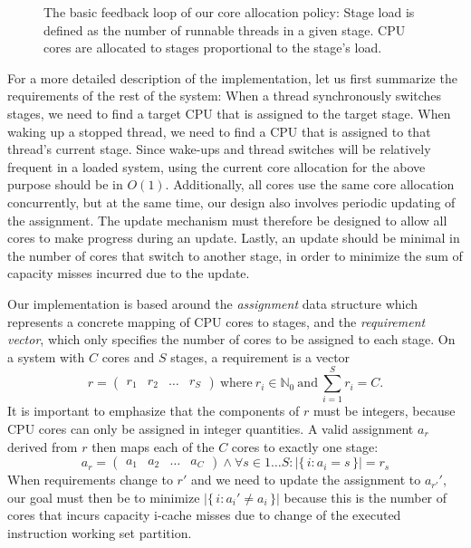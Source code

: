 \documentclass[12pt,a4paper]{book}
\begin{document}
\begin{figure}
    \caption{The basic feedback loop of our core allocation policy: Stage load is defined as the number of runnable threads in a given stage. CPU cores are allocated to stages proportional to the stage's load.}
    \label{fig:ch:di:pol:feedbackloop}
\end{figure}

For a more detailed description of the implementation, let us first summarize the requirements of the rest of the system:
When a thread synchronously switches stages, we need to find a target CPU that is assigned to the target stage.
When waking up a stopped thread, we need to find a CPU that is assigned to that thread's current stage.
Since wake-ups and thread switches will be relatively frequent in a loaded system, using the current core allocation for the above purpose should be in $O(1)$.
Additionally, all cores use the same core allocation concurrently, but at the same time, our design also involves periodic updating of the assignment.
The update mechanism must therefore be designed to allow all cores to make progress during an update.
Lastly, an update should be minimal in the number of cores that switch to another stage, in order to minimize the sum of capacity misses incurred due to the update.

Our implementation is based around the \emph{assignment} data structure which represents a concrete mapping of CPU cores to stages, and the \emph{requirement vector}, which only specifies the number of cores to be assigned to each stage.
On a system with $C$ cores and $S$ stages, a requirement is a vector
    \[ r = \begin{pmatrix} r_1 & r_2 & \dots & r_S \end{pmatrix}\ \text{where}\ r_i \in \mathbb{N}_0 \ \text{and}\  \sum_{i = 1}^{S} r_i  = C. \]
It is important to emphasize that the components of $r$ must be integers, because CPU cores can only be assigned in integer quantities.
A valid assignment $a_r$ derived from $r$ then maps each of the $C$ cores to exactly one stage:
    \[ a_{r} = \begin{pmatrix} a_1 & a_2 & \dots & a_C \end{pmatrix} \wedge \forall s \in 1 \dots S : \vert\{\, i : a_i = s \, \} \vert = r_s \]
When requirements change to $r'$ and we need to update the assignment to $a_{r'}'$, our goal must then be to minimize ${\vert\{\, i : a_i' \ne a_i \,\}\vert}$ because this is the number of cores that incurs capacity i-cache misses due to change of the executed instruction working set partition.
\end{document}
